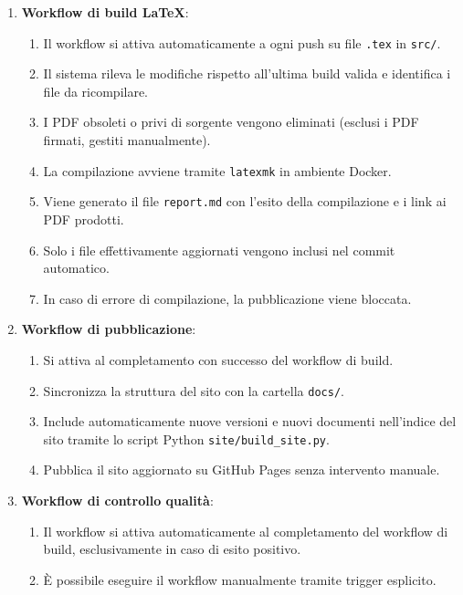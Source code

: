 \documentclass[a4paper, 11pt, oneside]{scrartcl}
\begin{document}
\begin{enumerate}
    \item \textbf{Workflow di build \LaTeX{}}:
          \begin{enumerate}[label=\alph*.]
              \item Il workflow si attiva automaticamente a ogni push su file \texttt{.tex} in \texttt{src/}.
              \item Il sistema rileva le modifiche rispetto all'ultima build valida e identifica i file da ricompilare.
              \item I PDF obsoleti o privi di sorgente vengono eliminati (esclusi i PDF firmati, gestiti manualmente).
              \item La compilazione avviene tramite \texttt{latexmk} in ambiente Docker{\scriptsize{}}.
              \item Viene generato il file \texttt{report.md} con l'esito della compilazione e i link ai PDF prodotti.
              \item Solo i file effettivamente aggiornati vengono inclusi nel commit automatico.
              \item In caso di errore di compilazione, la pubblicazione viene bloccata.
          \end{enumerate}
    \item \textbf{Workflow di pubblicazione}:
          \begin{enumerate}[label=\alph*.]
              \item Si attiva al completamento con successo del workflow di build.
              \item Sincronizza la struttura del sito con la cartella \texttt{docs/}.
              \item Include automaticamente nuove versioni e nuovi documenti nell'indice del sito tramite lo script Python \texttt{site/build\_site.py}.
              \item Pubblica il sito aggiornato su GitHub Pages senza intervento manuale.
          \end{enumerate}
    \item \textbf{Workflow di controllo qualità}:
          \begin{enumerate}[label=\alph*.]
              \item Il workflow si attiva automaticamente al completamento del workflow di build, esclusivamente in caso di esito positivo.
              \item È possibile eseguire il workflow manualmente tramite trigger esplicito.

\end{enumerate}
\end{enumerate}
\end{document}

